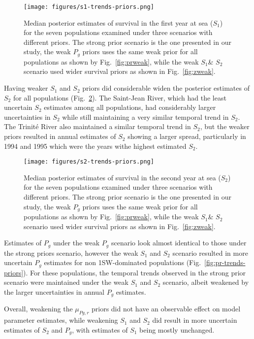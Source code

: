 \documentclass[12pt]{article}
\newcommand{\So}{$S_{1}$\xspace}
\newcommand{\St}{$S_{2}$\xspace}
\newcommand{\Pg}{$P_g$\xspace}
\newcommand{\prmu}{$\mu_{Pg,r}$\xspace}
\begin{document}
\begin{figure}[htbp] \centering
    \texttt{[image: figures/s1-trends-priors.png]}
    \caption{Median posterior estimates of survival in the first year at sea
        (\So) for the seven populations examined under three scenarios with
        different priors. The strong prior scenario is the one presented in
        our study, the weak \Pg priors uses the same weak prior for all
        populations as shown by Fig.~\ref{fig:prweak}, while the weak \So \&
        \St scenario used wider survival priors as shown in Fig.~\ref{fig:zweak}.} 
    \label{fig:s1-trends-priors} \end{figure}


Having weaker \So and \St priors did considerable widen the posterior
estimates of \St for all populations (Fig.~\ref{fig:s2-trends-priors}). The
Saint-Jean River, which had the least uncertain \St estimates among all
populations, had considerably larger uncertainties in \St while still
maintaining a very similar temporal trend in \St. The Trinité River also
maintained a similar temporal trend in \St, but the weaker priors resulted in
annual estimates of \St showing a larger spread, particularly in 1994 and 1995
which were the years withe highest estimated \St.


\begin{figure}[htbp] \centering
    \texttt{[image: figures/s2-trends-priors.png]}
    \caption{Median posterior estimates of survival in the second year at sea
        (\St) for the seven populations examined under three scenarios with
        different priors. The strong prior scenario is the one presented in
        our study, the weak \Pg priors uses the same weak prior for all
        populations as shown by Fig.~\ref{fig:prweak}, while the weak \So \&
        \St scenario used wider survival priors as shown in Fig.~\ref{fig:zweak}.} 
    \label{fig:s2-trends-priors} \end{figure}


Estimates of \Pg under the weak \Pg scenario look almost identical to those
under the strong priors scenario, however the weak \So and \St scenario
resulted in more uncertain \Pg estimates for non 1SW-dominated populations
(Fig.~\ref{fig:pr-trends-priors}). For these populations, the temporal trends
observed in the strong prior scenario were maintained under the weak \So and
\St scenario, albeit weakened by the larger uncertainties in annual \Pg
estimates.

Overall, weakening the \prmu priors did not have an observable effect on model
parameter estimates, while weakening \So and \St did result in more uncertain
estimates of \St and \Pg, with estimates of \So being mostly unchanged.
\end{document}
